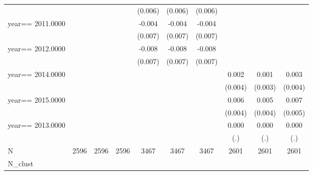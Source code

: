 \begin{table}[htbp]
\begin{tabular}{l*{9}{c}}
                    &               &               &               &     (0.006)   &     (0.006)   &     (0.006)   &               &               &               \\
year==  2011.0000   &               &               &               &      -0.004   &      -0.004   &      -0.004   &               &               &               \\
                    &               &               &               &     (0.007)   &     (0.007)   &     (0.007)   &               &               &               \\
year==  2012.0000   &               &               &               &      -0.008   &      -0.008   &      -0.008   &               &               &               \\
                    &               &               &               &     (0.007)   &     (0.007)   &     (0.007)   &               &               &               \\
year==  2014.0000   &               &               &               &               &               &               &       0.002   &       0.001   &       0.003   \\
                    &               &               &               &               &               &               &     (0.004)   &     (0.003)   &     (0.004)   \\
year==  2015.0000   &               &               &               &               &               &               &       0.006   &       0.005   &       0.007   \\
                    &               &               &               &               &               &               &     (0.004)   &     (0.004)   &     (0.005)   \\
year==  2013.0000   &               &               &               &               &               &               &       0.000   &       0.000   &       0.000   \\
                    &               &               &               &               &               &               &         (.)   &         (.)   &         (.)   \\
\hline
N                   &        2596   &        2596   &        2596   &        3467   &        3467   &        3467   &        2601   &        2601   &        2601   \\
N\_clust             &               &               &               &               &               &               &               &               &               \\

\end{tabular}
\end{table}

